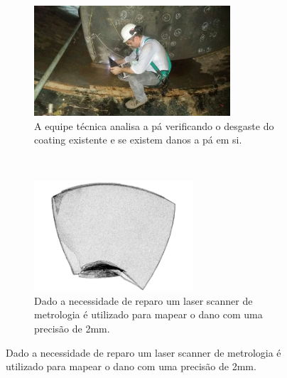 \begin{figure}[htbp]
\centering
\begin{subfigure}[t]{0.45\textwidth}
\includegraphics[width=\textwidth,
height=4.1cm]{figs/manolo}
\caption{A equipe técnica analisa a pá verificando o desgaste do coating
existente e se existem danos a pá em si.}
\label{fig:subim1}
\end{subfigure}
~
\begin{subfigure}[t]{0.45\textwidth}
\includegraphics[width=\textwidth,
height=4.1cm]{figs/modelo_pa_faro}
\caption{Dado a necessidade de reparo um laser scanner de metrologia é
utilizado para mapear o dano com uma precisão de 2mm.}
\label{fig:subim2}
\end{subfigure}
\label{fig:image1}
\end{figure}

